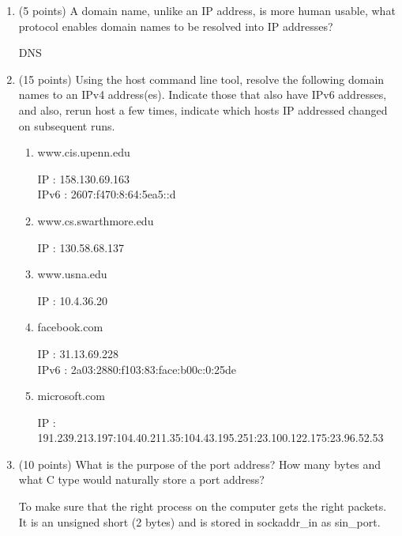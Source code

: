\documentclass{article}[9pt]
\newenvironment{myanswer}{\begin{mdframed}\begin{answerfont}}{\end{answerfont}\end{mdframed}}
\begin{document}
\begin{enumerate}
\item (5 points) A domain name, unlike an IP address, is more human usable, what
protocol enables domain names to be resolved into IP addresses?
\begin{myanswer}
DNS
\end{myanswer}

\item (15 points) Using the host command line tool, resolve the following domain
names to an IPv4 address(es). Indicate those that also have IPv6
addresses, and also, rerun host a few times, indicate which hosts
IP addressed changed on subsequent runs.

\begin{enumerate}
\item www.cis.upenn.edu
\begin{myanswer}
IP : 158.130.69.163\\
IPv6 : 2607:f470:8:64:5ea5::d
\end{myanswer}

\item www.cs.swarthmore.edu
\begin{myanswer}
IP : 130.58.68.137
\end{myanswer}

\item www.usna.edu
\begin{myanswer}
IP : 10.4.36.20
\end{myanswer}

\item facebook.com
\begin{myanswer}
IP : 31.13.69.228\\
IPv6 : 2a03:2880:f103:83:face:b00c:0:25de
\end{myanswer}

\item microsoft.com
\begin{myanswer}
IP : 191.239.213.197:104.40.211.35:104.43.195.251:23.100.122.175:23.96.52.53
\end{myanswer}

\end{enumerate}
\item (10 points) What is the purpose of the port address? How many bytes and what
C type would naturally store a port address?
\begin{myanswer}
To make sure that the right process on the computer gets the right
packets. It is an unsigned short (2 bytes) and is stored in sockaddr\_in as 
sin\_port.
\end{myanswer}


\end{enumerate}
\end{document}
